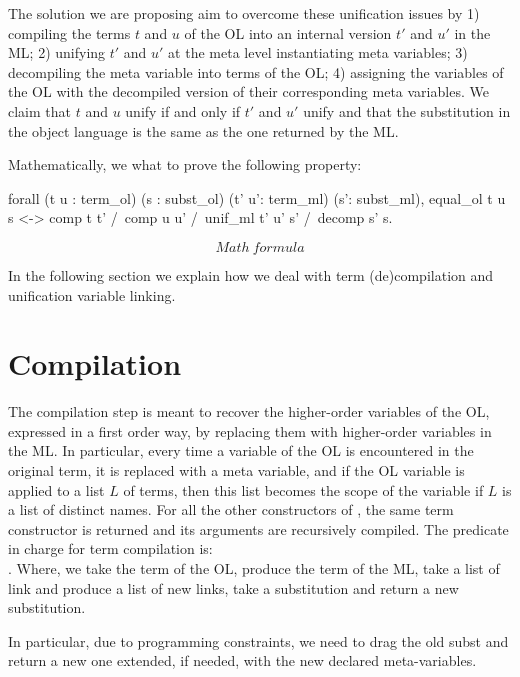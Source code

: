 \documentclass[sigconf,natbib=false]{acmart}
\begin{document}
The solution we are proposing aim to overcome these unification issues by 1)
compiling the terms $t$ and $u$ of the OL into an internal version $t'$ and $u'$
in the ML; 2) unifying $t'$ and $u'$ at the meta level instantiating meta
variables; 3) decompiling the meta variable into terms of the OL; 4) assigning
the variables of the OL with the decompiled version of their corresponding meta
variables. We claim that $t$ and $u$ unify if and only if $t'$ and $u'$ unify
and that the substitution in the object language is the same as the one returned
by the ML.  

Mathematically, we what to prove the following property:

\begin{coqcode}
  forall (t  u : term_ol) (s : subst_ol) 
         (t' u': term_ml) (s': subst_ml), 
    equal_ol t u s <->
      comp t t' /\ comp u u' /\ 
      unif_ml t' u' s' /\ decomp s' s.
\end{coqcode}

$$Math\ formula$$

In the following section we explain how we deal with term (de)compilation and
unification variable linking.

\section[Compilation: fo\_tm to tm]{Compilation}

The compilation step is meant to recover the higher-order variables of the OL,
expressed in a first order way, by replacing them with higher-order variables in
the ML. In particular, every time a variable of the OL is encountered in the
original term, it is replaced with a meta variable, and if the OL variable is
applied to a list $L$ of terms, then this list becomes the scope of the variable
if $L$ is a list of distinct names. For all the other constructors of
\elpiIn{tm}, the same term constructor is returned and its arguments are
recursively compiled. The predicate in charge for term compilation is:\\
\elpiIn{type comp tm -> tm -> links -> links -> subst -> subst -> o}.
Where, we take the term of the OL, produce the term of the ML, take a list
of link and produce a list of new links, take a substitution and return a 
new substitution.

In particular, due to programming constraints, we need to drag the old subst and
return a new one extended, if needed, with the new declared meta-variables.
\end{document}
